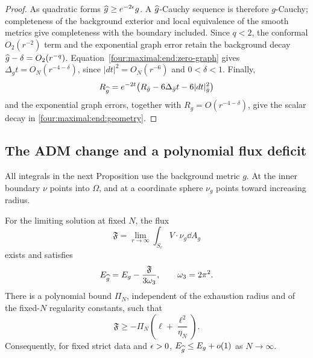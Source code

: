\begin{proof}
As quadratic forms $\widehat g\ge e^{-2\epsilon}g$.  A $\widehat g$-Cauchy sequence
is therefore $g$-Cauchy; completeness of the background exterior and
local equivalence of the smooth metrics give completeness with the
boundary included.  Since $q<2$, the conformal $O_2(r^{-2})$ term and
the exponential graph error retain the background decay
$\widehat g-\delta=O_2(r^{-q})$.  Equation~\eqref{four:maximal:end:zero-graph} gives
$\Delta_g t=O_N(r^{-4-\delta})$, since $|dt|^2=O_N(r^{-6})$ and
$0<\delta<1$.  Finally,
\[
 R_{\widehat g}
  =e^{-2t}\bigl(R_{\bar g}-6\Delta_{\bar g}t
                                  -6|dt|_{\bar g}^2\bigr)
\]
and the exponential graph errors, together with
$R_g=O(r^{-4-\delta})$, give the scalar decay in
\eqref{four:maximal:end:geometry}.
\end{proof}

\subsection{The ADM change and a polynomial flux deficit}

All integrals in the next Proposition use the background metric $g$.
At the inner boundary $\nu$ points into $\Omega$, and at a coordinate
sphere $\nu_g$ points toward increasing radius.

\begin{proposition}\label{four:maximal:prop:flux}
For the limiting solution at fixed $N$, the flux
\[
 \mathfrak F=\lim_{r\to\infty}\int_{S_r}V\cdot\nu_g\dd A_g
\]
exists and satisfies
\begin{equation}\label{four:maximal:end:mass-flux}
 E_{\widehat g}=E_g-\frac{\mathfrak F}{3\omega_3},
 \qquad \omega_3=2\pi^2.
\end{equation}
There is a polynomial bound $\Pi_N$, independent of the exhaustion
radius and of the fixed-$N$ regularity constants, such that
\begin{equation}\label{four:maximal:end:flux-deficit}
 \mathfrak F\ge-\Pi_N\left(\ell+\frac{\ell^2}{\eta_N}\right).
\end{equation}
Consequently, for fixed strict data and $\epsilon>0$,
$E_{\widehat g}\le E_g+o(1)$ as $N\to\infty$.
\end{proposition}

